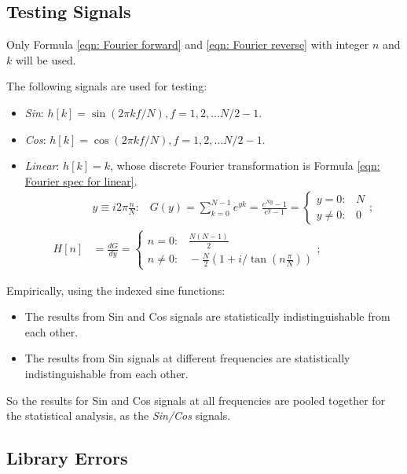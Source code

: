 \documentclass[twoside]{article}
\numberwithin{equation}{section}
\newcommand{\eqspace}{\;\;\;}
\begin{document}
\subsection{Testing Signals}

Only Formula \eqref{eqn: Fourier forward} and \eqref{eqn: Fourier reverse} with integer $n$ and $k$ will be used.

The following signals are used for testing:
\begin{itemize}
\item \emph{Sin}: $h[k] = \sin(2\pi k f/N), f = 1, 2, ... N/2 -1$.

\item \emph{Cos}: $h[k] = \cos(2\pi k f/N), f = 1, 2, ... N/2 -1$.

\item \emph{Linear}: $h[k] = k$, whose discrete Fourier transformation is Formula \eqref{eqn: Fourier spec for linear}.
\begin{align}
& y \equiv i 2\pi \frac{n}{N}: \eqspace G(y) = \sum_{k=0}^{N-1}  e^{y k} = \frac{e^{N y} - 1}{e^y - 1}
 = \begin{cases} y = 0: \eqspace N \\ y \neq 0: \eqspace 0 \end{cases}; \nonumber \\
\label{eqn: Fourier spec for linear}
H[n] &= \frac{d G}{d y} = \begin{cases} n = 0: \eqspace \frac{N (N-1)}{2} \\ n \neq 0: \eqspace - \frac{N}{2}(1 + i /\tan(n \frac{\pi}{N})) \end{cases};
\end{align}

\end{itemize}

Empirically, using the indexed sine functions:
\begin{itemize}
\item The results from Sin and Cos signals are statistically indistinguishable from each other.

\item The results from Sin signals at different frequencies are statistically indistinguishable from each other.
\end{itemize}
So the results for Sin and Cos signals at all frequencies are pooled together for the statistical analysis, as the \emph{Sin/Cos} signals.


\subsection{Library Errors}
\end{document}
